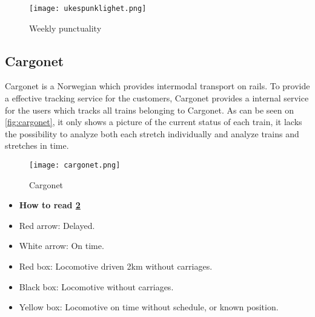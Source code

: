 \begin{figure}[!htbp]
	\texttt{[image: ukespunklighet.png]}
	\caption[Weekly punctuality]{Weekly punctuality\cite{sintefPresis}}
	\label{fig:ukespunklighet}
\end{figure}
\pagebreak

\clearpage
\subsection{Cargonet} %
\label{sub:subsection_cargonet}

Cargonet is a Norwegian which provides intermodal transport on rails. To 
provide a effective tracking service for the customers, Cargonet provides a 
internal service for the users which tracks all trains belonging to Cargonet.
As can be seen on \vref{fig:cargonet}, it only shows a picture of the current
status of each train, it lacks the possibility to analyze both each stretch 
individually  and analyze trains and stretches in time.

\begin{figure}[!htbp]
	\texttt{[image: cargonet.png]}
	\caption[Cargonet]{Cargonet \cite{cargonet}}
	\label{fig:cargonet}
\end{figure}

\begin{itemize}
	\item [] \textbf{How to read \ref{fig:cargonet}}
	\item Red arrow:\hspace{4ex} Delayed.
	\item White arrow:\hspace{4ex} On time.
	\item Red box:\hspace{4ex} Locomotive driven 2km without carriages.
	\item Black box:\hspace{4ex} Locomotive without carriages.
	\item Yellow box:\hspace{4ex} Locomotive on time without schedule, or known position.
\end{itemize}

\pagebreak
